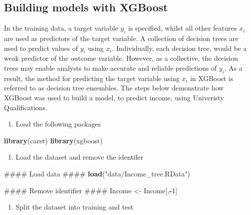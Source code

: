 \documentclass[]{book}
\newenvironment{Shaded}{\begin{snugshade}}{\end{snugshade}}
\newcommand{\KeywordTok}[1]{\textcolor[rgb]{0.13,0.29,0.53}{\textbf{#1}}}
\newcommand{\DecValTok}[1]{\textcolor[rgb]{0.00,0.00,0.81}{#1}}
\newcommand{\StringTok}[1]{\textcolor[rgb]{0.31,0.60,0.02}{#1}}
\newcommand{\OperatorTok}[1]{\textcolor[rgb]{0.81,0.36,0.00}{\textbf{#1}}}
\newcommand{\NormalTok}[1]{#1}
\providecommand{\tightlist}{%
  \setlength{\itemsep}{0pt}\setlength{\parskip}{0pt}}
\begin{document}
\subsection{Building models with
XGBoost}\label{building-models-with-xgboost}

In the training data, a target variable \(y_{i}\) is specified, whilst
all other features \(x_{i}\) are used as predictors of the target
variable. A collection of decision trees are used to predict values of
\(y_{i}\) using \(x_{i}\). Individually, each decision tree, would be a
weak predictor of the outcome variable. However, as a collective, the
decision trees may enable analysts to make accurate and reliable
predictions of \(y_{i}\). As a result, the method for predicting the
target variable using \(x_{i}\) in XGBoost is referred to as decision
tree ensembles. The steps below demonstrate how XGBoost was used to
build a model, to predict income, using Univeristy Qualifications.

\begin{enumerate}
\def\labelenumi{\arabic{enumi})}
\tightlist
\item
  Load the following packages
\end{enumerate}

\begin{Shaded}
\begin{Highlighting}[]
\KeywordTok{library}\NormalTok{(caret)}
\KeywordTok{library}\NormalTok{(xgboost)}
\end{Highlighting}
\end{Shaded}

\begin{enumerate}
\def\labelenumi{\arabic{enumi})}
\setcounter{enumi}{1}
\tightlist
\item
  Load the dataset and remove the identifer
\end{enumerate}

\begin{Shaded}
\begin{Highlighting}[]
\NormalTok{#### Load data #### }
\KeywordTok{load}\NormalTok{(}\StringTok{"data/Income_tree.RData"}\NormalTok{)}

\NormalTok{#### Remove identifier ####}
\NormalTok{Income <-}\StringTok{ }\NormalTok{Income[,}\OperatorTok{-}\DecValTok{1}\NormalTok{]}
\end{Highlighting}
\end{Shaded}

\begin{enumerate}
\def\labelenumi{\arabic{enumi})}
\setcounter{enumi}{2}
\tightlist
\item
  Split the dataset into training and test
\end{enumerate}
\end{document}
